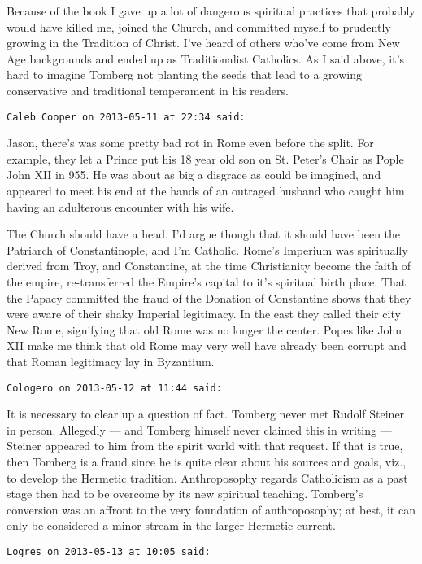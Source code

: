 \begin{footnotesize}
\begin{sffamily}
Because of the book I gave up a lot of dangerous spiritual practices that probably would have killed me, joined the Church, and committed myself to prudently growing in the Tradition of Christ. I've heard of others who've come from New Age backgrounds and ended up as Traditionalist Catholics. As I said above, it's hard to imagine Tomberg not planting the seeds that lead to a growing conservative and traditional temperament in his readers.


\hfill

\texttt{Caleb Cooper on 2013-05-11 at 22:34 said: }

Jason, there's was some pretty bad rot in Rome even before the split. For example, they let a Prince put his 18 year old son on St. Peter's Chair as Pople John XII in 955. He was about as big a disgrace as could be imagined, and appeared to meet his end at the hands of an outraged husband who caught him having an adulterous encounter with his wife. 

The Church should have a head. I'd argue though that it should have been the Patriarch of Constantinople, and I'm Catholic. Rome's Imperium was spiritually derived from Troy, and Constantine, at the time Christianity become the faith of the empire, re-transferred the Empire's capital to it's spiritual birth place. That the Papacy committed the fraud of the Donation of Constantine shows that they were aware of their shaky Imperial legitimacy. In the east they called their city New Rome, signifying that old Rome was no longer the center. Popes like John XII make me think that old Rome may very well have already been corrupt and that Roman legitimacy lay in Byzantium.


\hfill

\texttt{Cologero on 2013-05-12 at 11:44 said: }

It is necessary to clear up a question of fact. Tomberg never met Rudolf Steiner in person. Allegedly — and Tomberg himself never claimed this in writing — Steiner appeared to him from the spirit world with that request. If that is true, then Tomberg is a fraud since he is quite clear about his sources and goals, viz., to develop the Hermetic tradition. Anthroposophy regards Catholicism as a past stage then had to be overcome by its new spiritual teaching. Tomberg's conversion was an affront to the very foundation of anthroposophy; at best, it can only be considered a minor stream in the larger Hermetic current.


\hfill

\texttt{Logres on 2013-05-13 at 10:05 said: }


\end{sffamily}
\end{footnotesize}
